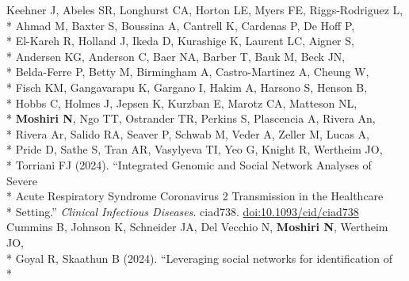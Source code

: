 \documentclass[margin,line]{res}
\begin{document}
\begin{resume}
\hspace*{4mm} Keehner J, Abeles SR, Longhurst CA, Horton LE, Myers FE, Riggs-Rodriguez L,\\*
\hspace*{9.5mm} Ahmad M, Baxter S, Boussina A, Cantrell K, Cardenas P, De Hoff P,\\*
\hspace*{9.5mm} El-Kareh R, Holland J, Ikeda D, Kurashige K, Laurent LC, Aigner S,\\*
\hspace*{9.5mm} Andersen KG, Anderson C, Baer NA, Barber T, Bauk M, Beck JN,\\*
\hspace*{9.5mm} Belda-Ferre P, Betty M, Birmingham A, Castro-Martinez A, Cheung W,\\*
\hspace*{9.5mm} Fisch KM, Gangavarapu K, Gargano I, Hakim A, Harsono S, Henson B,\\*
\hspace*{9.5mm} Hobbs C, Holmes J, Jepsen K, Kurzban E, Marotz CA, Matteson NL,\\*
\hspace*{9.5mm} \textbf{Moshiri N}, Ngo TT, Ostrander TR, Perkins S, Plascencia A, Rivera An,\\*
\hspace*{9.5mm} Rivera Ar, Salido RA, Seaver P, Schwab M, Veder A, Zeller M, Lucas A,\\*
\hspace*{9.5mm} Pride D, Sathe S, Tran AR, Vasylyeva TI, Yeo G, Knight R, Wertheim JO,\\*
\hspace*{9.5mm} Torriani FJ (2024). ``Integrated Genomic and Social Network Analyses of Severe\\*
\hspace*{9.5mm} Acute Respiratory Syndrome Coronavirus 2 Transmission in the Healthcare\\*\vspace{2mm}
\hspace*{8mm} Setting.'' \textit{Clinical Infectious Diseases}. ciad738. \href{https://doi.org/10.1093/cid/ciad738}{doi:10.1093/cid/ciad738}\\
\hspace*{4mm} Cummins B, Johnson K, Schneider JA, Del Vecchio N, \textbf{Moshiri N}, Wertheim JO,\\*
\hspace*{9.5mm} Goyal R, Skaathun B (2024). ``Leveraging social networks for identification of\\*

\end{resume}
\end{document}
